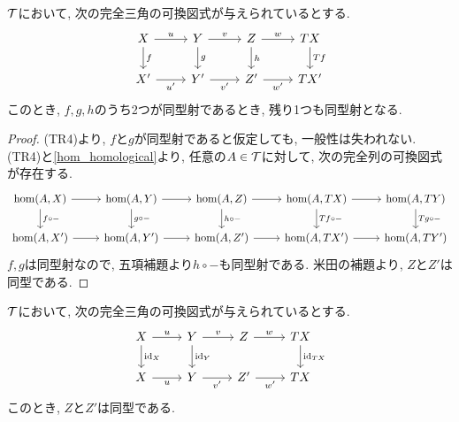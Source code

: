\documentclass[uplatex, a4paper, 14Q, dvipdfmx]{jsarticle}
\begin{document}
\begin{theorem} \label{two_out_of_three}
  $\mathcal{T}$において, 次の完全三角の可換図式が与えられているとする. 
  \[\begin{tikzcd}
    X & Y & Z & TX \\
    {X'} & {Y'} & {Z'} & {TX'}
    \arrow["u", from=1-1, to=1-2]
    \arrow["v", from=1-2, to=1-3]
    \arrow["w", from=1-3, to=1-4]
    \arrow["f", from=1-1, to=2-1]
    \arrow["g", from=1-2, to=2-2]
    \arrow["h", from=1-3, to=2-3]
    \arrow["Tf", from=1-4, to=2-4]
    \arrow["{u'}"', from=2-1, to=2-2]
    \arrow["{v'}"', from=2-2, to=2-3]
    \arrow["{w'}"', from=2-3, to=2-4]
  \end{tikzcd}\] 
  このとき, $f,g,h$のうち2つが同型射であるとき, 残り1つも同型射となる. 
\end{theorem}

\begin{proof}
  (TR4)より, $f$と$g$が同型射であると仮定しても, 一般性は失われない. 
  (TR4)と\cref{hom_homological}より, 任意の$A \in \mathcal{T}$に対して, 次の完全列の可換図式が存在する. 
  \[\begin{tikzcd}
    {\hom(A,X)} & {\hom(A,Y)} & {\hom(A,Z)} & {\hom(A,TX)} & {\hom(A,TY)} \\
    {\hom(A,X')} & {\hom(A,Y')} & {\hom(A,Z')} & {\hom(A,TX')} & {\hom(A,TY')}
    \arrow[from=1-1, to=1-2]
    \arrow[from=1-2, to=1-3]
    \arrow[from=1-3, to=1-4]
    \arrow[from=1-4, to=1-5]
    \arrow[from=2-1, to=2-2]
    \arrow[from=2-2, to=2-3]
    \arrow[from=2-3, to=2-4]
    \arrow[from=2-4, to=2-5]
    \arrow["{f \circ -}", from=1-1, to=2-1]
    \arrow["{g \circ -}", from=1-2, to=2-2]
    \arrow["{h \circ -}", from=1-3, to=2-3]
    \arrow["{Tf \circ -}", from=1-4, to=2-4]
    \arrow["{Tg \circ -}", from=1-5, to=2-5]
  \end{tikzcd}\]
  $f,g$は同型射なので, 五項補題より$h \circ -$も同型射である. 
  米田の補題より, $Z$と$Z'$は同型である. 
\end{proof}

\begin{corollary} \label{iso_z}
  $\mathcal{T}$において, 次の完全三角の可換図式が与えられているとする. 
  \[\begin{tikzcd}
    X & Y & Z & TX \\
    {X} & {Y} & {Z'} & {TX}
    \arrow["u", from=1-1, to=1-2]
    \arrow["v", from=1-2, to=1-3]
    \arrow["w", from=1-3, to=1-4]
    \arrow["{\id_X}", from=1-1, to=2-1]
    \arrow["{\id_Y}", from=1-2, to=2-2]
    \arrow["{\id_{TX}}", from=1-4, to=2-4]
    \arrow["{u}"', from=2-1, to=2-2]
    \arrow["{v'}"', from=2-2, to=2-3]
    \arrow["{w'}"', from=2-3, to=2-4]
  \end{tikzcd}\] 
  このとき, $Z$と$Z'$は同型である. 
\end{corollary}
\end{document}
